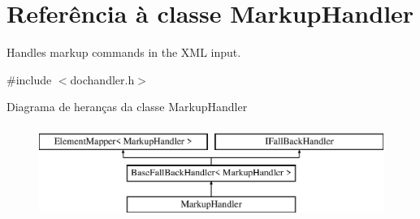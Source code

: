 \hypertarget{class_markup_handler}{\section{Referência à classe Markup\-Handler}
\label{class_markup_handler}
}


Handles markup commands in the X\-M\-L input.  




{\ttfamily \#include $<$dochandler.\-h$>$}

Diagrama de heranças da classe Markup\-Handler\begin{figure}[H]
\begin{center}
\leavevmode
\includegraphics[height=3.000000cm]{class_markup_handler}
\end{center}
\end{figure}
